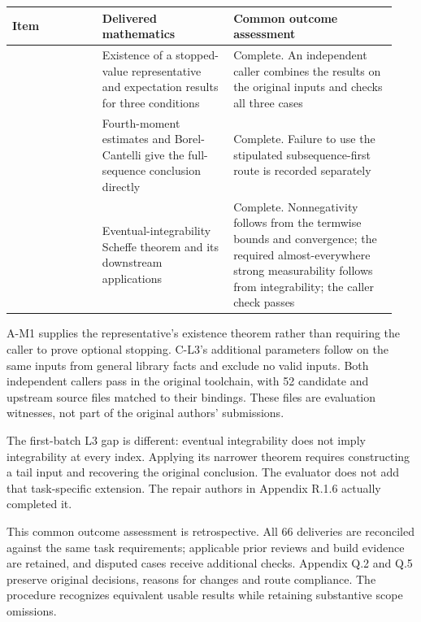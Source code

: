 \begingroup\small\setlength{\tabcolsep}{3pt}\renewcommand{\arraystretch}{1.14}
\par\nopagebreak\medskip\noindent\begin{minipage}[t]{\linewidth}
\begin{tabular}{>{\raggedright\arraybackslash}p{0.22\linewidth}>{\raggedright\arraybackslash}p{0.32\linewidth}>{\raggedright\arraybackslash}p{0.4\linewidth}}
\toprule
\textbf{Item} & \textbf{Delivered mathematics} & \textbf{Common outcome assessment}\\\midrule

{A-M1} & {Existence of a stopped-value representative and expectation results for three conditions} & {Complete. An independent caller combines the results on the original inputs and checks all three cases}\\
{B-M2} & {Fourth-moment estimates and Borel-Cantelli give the full-sequence conclusion directly} & {Complete. Failure to use the stipulated subsequence-first route is recorded separately}\\
{C-L3} & {Eventual-integrability Scheffe theorem and its downstream applications} & {Complete. Nonnegativity follows from the termwise bounds and convergence; the required almost-everywhere strong measurability follows from integrability; the caller check passes}\\
\bottomrule\end{tabular}\end{minipage}\par\medskip\endgroup
A-M1 supplies the representative's existence theorem rather than requiring the caller to prove optional stopping. C-L3's additional parameters follow on the same inputs from general library facts and exclude no valid inputs. Both independent callers pass in the original toolchain, with 52 candidate and upstream source files matched to their bindings. These files are evaluation witnesses, not part of the original authors' submissions.

The first-batch L3 gap is different: eventual integrability does not imply integrability at every index. Applying its narrower theorem requires constructing a tail input and recovering the original conclusion. The evaluator does not add that task-specific extension. The repair authors in Appendix R.1.6 actually completed it.

This common outcome assessment is retrospective. All 66 deliveries are reconciled against the same task requirements; applicable prior reviews and build evidence are retained, and disputed cases receive additional checks. Appendix Q.2 and Q.5 preserve original decisions, reasons for changes and route compliance. The procedure recognizes equivalent usable results while retaining substantive scope omissions.

